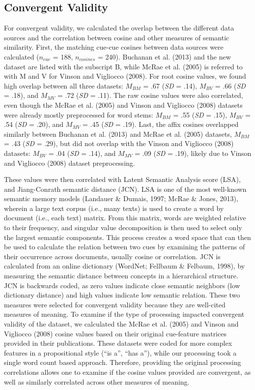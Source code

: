 \documentclass[english,,man]{apa6}
\begin{document}
\hypertarget{convergent-validity}{%
\subsection{Convergent Validity}\label{convergent-validity}}

For convergent validity, we calculated the overlap between the different data sources and the correlation between cosine and other measures of semantic similarity. First, the matching cue-cue cosines between data sources were calculated (\(n_{cue}\) = 188, \(n_{cosines}\) = 240). Buchanan et al. (2013) and the new dataset are listed with the subscript B, while McRae et al. (2005) is referred to with M and V for Vinson and Vigliocco (2008). For root cosine values, we found high overlap between all three datasets: \(M_{BM}\) = .67 (\emph{SD} = .14), \(M_{BV}\) = .66 (\emph{SD} = .18), and \(M_{MV}\) = .72 (\emph{SD} = .11). The raw cosine values were also correlated, even though the McRae et al. (2005) and Vinson and Vigliocco (2008) datasets were already mostly preprocessed for word stems: \(M_{BM}\) = .55 (\emph{SD} = .15), \(M_{BV}\) = .54 (\emph{SD} = .20), and \(M_{MV}\) = .45 (\emph{SD} = .19). Last, the affix cosines overlapped similarly between Buchanan et al. (2013) and McRae et al. (2005) datasets, \(M_{BM}\) = .43 (\emph{SD} = .29), but did not overlap with the Vinson and Vigliocco (2008) datasets: \(M_{BV}\) = .04 (\emph{SD} = .14), and \(M_{MV}\) = .09 (\emph{SD} = .19), likely due to Vinson and Vigliocco (2008) dataset preprocessing.

These values were then correlated with Latent Semantic Analysis score (LSA), and Jiang-Conrath semantic distance (JCN). LSA is one of the most well-known semantic memory models (Landauer \& Dumais, 1997; McRae \& Jones, 2013), wherein a large text corpus (i.e., many texts) is used to create a word by document (i.e., each text) matrix. From this matrix, words are weighted relative to their frequency, and singular value decomposition is then used to select only the largest semantic components. This process creates a word space that can then be used to calculate the relation between two cues by examining the patterns of their occurrence across documents, usually cosine or correlation. JCN is calculated from an online dictionary (WordNet; Fellbaum \& Felbaum, 1998), by measuring the semantic distance between concepts in a hierarchical structure. JCN is backwards coded, as zero values indicate close semantic neighbors (low dictionary distance) and high values indicate low semantic relation. These two measures were selected for convergent validity because they are well-cited measures of meaning. To examine if the type of processing impacted convergent validity of the dataset, we calculated the McRae et al. (2005) and Vinson and Vigliocco (2008) cosine values based on their original cue-feature matrices provided in their publications. These datasets were coded for more complex features in a propositional style (\enquote{is a}, \enquote{has a}), while our processing took a single word count based approach. Therefore, providing the original processing correlations allows one to examine if the cosine values provided are convergent, as well as similarly correlated across other measures of meaning.
\end{document}
